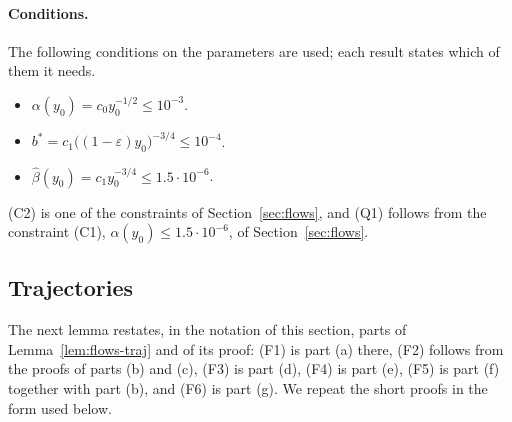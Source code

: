 \documentclass[11pt]{amsart}
\newcommand{\eps}{\varepsilon}
\theoremstyle{definition}
\theoremstyle{remark}
\numberwithin{equation}{section}
\begin{document}
\paragraph{Conditions.}
The following conditions on the parameters are used; each result states which of them it needs.
\begin{itemize}
\item[(Q1)] $\alpha(y_0)=c_0y_0^{-1/2}\le10^{-3}$.
\item[(Q2)] $b^*=c_1\bigl((1-\eps)y_0\bigr)^{-3/4}\le10^{-4}$.
\item[(C2)] $\hat\beta(y_0)=c_1y_0^{-3/4}\le1.5\cdot10^{-6}$.
\end{itemize}
(C2) is one of the constraints of Section~\ref{sec:flows}, and (Q1) follows from the constraint (C1), $\alpha(y_0)\le1.5\cdot10^{-6}$, of Section~\ref{sec:flows}.

\subsection{Trajectories}\label{ssec:P12-traj}

The next lemma restates, in the notation of this section, parts of Lemma~\ref{lem:flows-traj} and of its proof: (F1)
is part (a) there, (F2) follows from the proofs of parts (b) and (c), (F3) is part (d), (F4) is part (e), (F5) is part
(f) together with part (b), and (F6) is part (g). We repeat the short proofs in the form used below.
\end{document}
